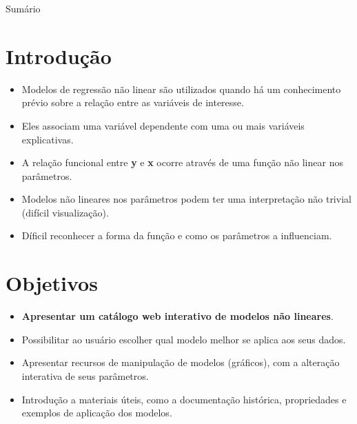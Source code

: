 \begin{frame}{Sumário}

\tableofcontents

\end{frame}

\section{Introdução}\label{introducao}

\begin{frame}

\begin{itemize}
\item
  Modelos de regressão não linear são utilizados quando há um
  conhecimento prévio sobre a relação entre as variáveis de interesse.
\item
  Eles associam uma variável dependente com uma ou mais variáveis
  explicativas.
\item
  A relação funcional entre \textbf{y} e \textbf{x} ocorre através de
  uma função não linear nos parâmetros.
\item
  Modelos não lineares nos parâmetros podem ter uma interpretação não
  trivial (difícil visualização).
\item
  Díficil reconhecer a forma da função e como os parâmetros a
  influenciam.
\end{itemize}

\end{frame}

\section{Objetivos}\label{objetivos}

\begin{frame}

\begin{itemize}
\item
  \textbf{Apresentar um catálogo web interativo de modelos não
  lineares}.
\item
  Possibilitar ao usuário escolher qual modelo melhor se aplica aos seus
  dados.
\item
  Apresentar recursos de manipulação de modelos (gráficos), com a
  alteração interativa de seus parâmetros.
\item
  Introdução a materiais úteis, como a documentação histórica,
  propriedades e exemplos de aplicação dos modelos.
\end{itemize}

\end{frame}

